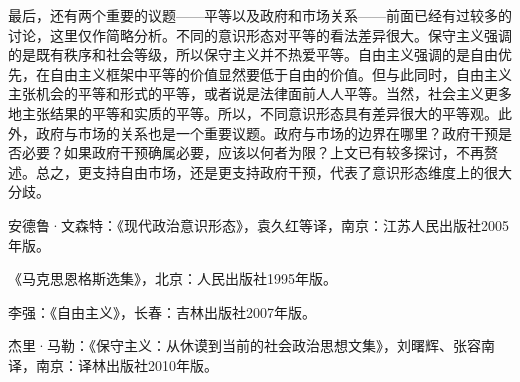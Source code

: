 最后，还有两个重要的议题——平等以及政府和市场关系——前面已经有过较多的讨论，这里仅作简略分析。不同的意识形态对平等的看法差异很大。保守主义强调的是既有秩序和社会等级，所以保守主义并不热爱平等。自由主义强调的是自由优先，在自由主义框架中平等的价值显然要低于自由的价值。但与此同时，自由主义主张机会的平等和形式的平等，或者说是法律面前人人平等。当然，社会主义更多地主张结果的平等和实质的平等。所以，不同意识形态具有差异很大的平等观。此外，政府与市场的关系也是一个重要议题。政府与市场的边界在哪里？政府干预是否必要？如果政府干预确属必要，应该以何者为限？上文已有较多探讨，不再赘述。总之，更支持自由市场，还是更支持政府干预，代表了意识形态维度上的很大分歧。


安德鲁·文森特：《现代政治意识形态》，袁久红等译，南京：江苏人民出版社2005年版。

《马克思恩格斯选集》，北京：人民出版社1995年版。

李强：《自由主义》，长春：吉林出版社2007年版。

杰里·马勒：《保守主义：从休谟到当前的社会政治思想文集》，刘曙辉、张容南译，南京：译林出版社2010年版。
